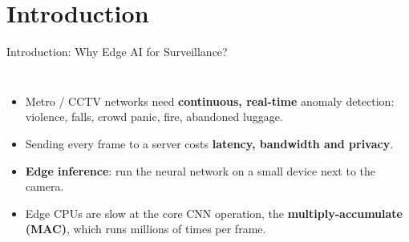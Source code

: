 \documentclass[aspectratio=169,11pt]{beamer}
\begin{document}
\section{Introduction}
\begin{frame}{Introduction: Why Edge AI for Surveillance?}
  \begin{columns}[T]
    \begin{itemize}
      \item Metro / CCTV networks need \textbf{continuous, real-time} anomaly
            detection: violence, falls, crowd panic, fire, abandoned luggage.
      \item Sending every frame to a server costs \textbf{latency, bandwidth
            and privacy}.
      \item \textbf{Edge inference}: run the neural network on a small device
            next to the camera.
      \item Edge CPUs are slow at the core CNN operation, the
            \textbf{multiply-accumulate (MAC)}, which runs millions of times per frame.
    \end{itemize}
    \centering
  \end{columns}
\end{frame}
\end{document}
